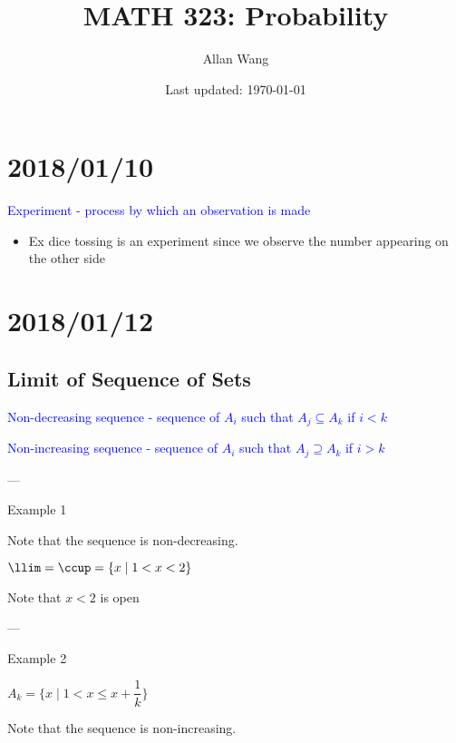 \documentclass[12 pt]{article}
\author{Allan Wang}
\date{Last updated: \today}
\title{MATH 323: Probability}
\newcommand{\ddef}[1]{\textcolor{blue}{#1}}
\begin{document}
\onehalfspacing
\maketitle
\tableofcontents
\pagebreak
\section{2018/01/10}

\ddef{Experiment - process by which an observation is made}

\begin{itemize}
    \item Ex dice tossing is an experiment since we observe the number appearing on the other side
\end{itemize}

\section{2018/01/12}

\subsection{Limit of Sequence of Sets}

\ddef{Non-decreasing sequence - sequence of \(A_i\) such that \(A_j \subseteq A_k\) if \(i < k\)}

\ddef{Non-increasing sequence - sequence of \(A_i\) such that \(A_j \supseteq A_k\) if \(i > k\)}

---

Example 1


Note that the sequence is non-decreasing.

\(\llim = \ccup = \{x \mid 1 < x < 2\}\)

Note that \(x < 2\) is open

---

Example 2

\(A_k = \{x \mid 1 < x \le x + \dfrac{1}{k}\}\)

Note that the sequence is non-increasing.
\end{document}
